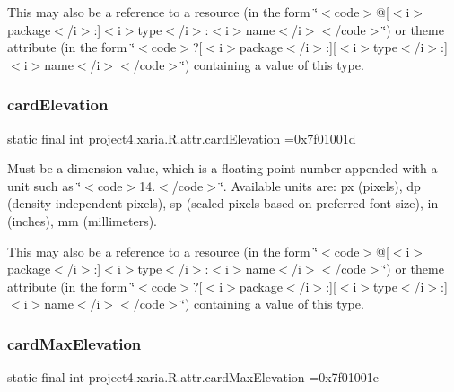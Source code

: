 This may also be a reference to a resource (in the form \char`\"{}$<$code$>$@\mbox{[}$<$i$>$package$<$/i$>$\+:\mbox{]}$<$i$>$type$<$/i$>$\+:$<$i$>$name$<$/i$>$$<$/code$>$\char`\"{}) or theme attribute (in the form \char`\"{}$<$code$>$?\mbox{[}$<$i$>$package$<$/i$>$\+:\mbox{]}\mbox{[}$<$i$>$type$<$/i$>$\+:\mbox{]}$<$i$>$name$<$/i$>$$<$/code$>$\char`\"{}) containing a value of this type. \mbox{\label{classproject4_1_1xaria_1_1R_1_1attr_a5f564005af283aad344ea6cd4f219f1a}} 
\subsubsection{\texorpdfstring{card\+Elevation}{cardElevation}}
{\footnotesize\ttfamily static final int project4.\+xaria.\+R.\+attr.\+card\+Elevation =0x7f01001d\hspace{0.3cm}{\ttfamily [static]}}

Must be a dimension value, which is a floating point number appended with a unit such as \char`\"{}$<$code$>$14.\+5sp$<$/code$>$\char`\"{}. Available units are\+: px (pixels), dp (density-\/independent pixels), sp (scaled pixels based on preferred font size), in (inches), mm (millimeters). 

This may also be a reference to a resource (in the form \char`\"{}$<$code$>$@\mbox{[}$<$i$>$package$<$/i$>$\+:\mbox{]}$<$i$>$type$<$/i$>$\+:$<$i$>$name$<$/i$>$$<$/code$>$\char`\"{}) or theme attribute (in the form \char`\"{}$<$code$>$?\mbox{[}$<$i$>$package$<$/i$>$\+:\mbox{]}\mbox{[}$<$i$>$type$<$/i$>$\+:\mbox{]}$<$i$>$name$<$/i$>$$<$/code$>$\char`\"{}) containing a value of this type. \mbox{\label{classproject4_1_1xaria_1_1R_1_1attr_a18c503e6c085a118afe64df20415981b}} 
\subsubsection{\texorpdfstring{card\+Max\+Elevation}{cardMaxElevation}}
{\footnotesize\ttfamily static final int project4.\+xaria.\+R.\+attr.\+card\+Max\+Elevation =0x7f01001e\hspace{0.3cm}{\ttfamily [static]}}

